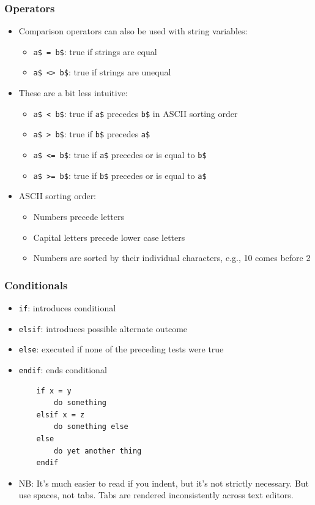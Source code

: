 \documentclass[handout]{beamer}
\begin{document}
\begin{frame}[fragile]
\frametitle{Operators}
\begin{itemize}
    \item <1-> Comparison operators can also be used with string variables:
    \begin{itemize}
        \item \texttt{a\$ = b\$}: true if strings are equal
        \item \texttt{a\$ <> b\$}: true if strings are unequal
    \end{itemize}
    \item <2-> These are a bit less intuitive:
    \begin{itemize}
        \item \texttt{a\$ < b\$}: true if \texttt{a\$} precedes \texttt{b\$} in ASCII sorting order
        \item \texttt{a\$ > b\$}: true if \texttt{b\$} precedes \texttt{a\$}
        \item \texttt{a\$ <= b\$}: true if \texttt{a\$} precedes or is equal to \texttt{b\$}
        \item \texttt{a\$ >= b\$}: true if \texttt{b\$} precedes or is equal to \texttt{a\$}
    \end{itemize}

    \item <3-> ASCII sorting order:
    \begin{itemize}
        \item Numbers precede letters
        \item Capital letters precede lower case letters
        \item Numbers are sorted by their individual characters, e.g., 10 comes before 2 
    \end{itemize}

\end{itemize}
\end{frame}

\begin{frame}[fragile]
\frametitle{Conditionals}
\begin{itemize}
    \item <1-> \texttt{if}: introduces conditional
    \item <1-> \texttt{elsif}: introduces possible alternate outcome
    \item <1-> \texttt{else}: executed if none of the preceding tests were true
    \item <1-> \texttt{endif}: ends conditional
    
    \begin{verbatim}
    if x = y
        do something
    elsif x = z
        do something else
    else
        do yet another thing
    endif
    \end{verbatim}

    \item <1-> \scriptsize NB: It's much easier to read if you indent, but it's not strictly necessary. But use spaces, not tabs. Tabs are rendered inconsistently across text editors.

\end{itemize}
\end{frame}
\end{document}
